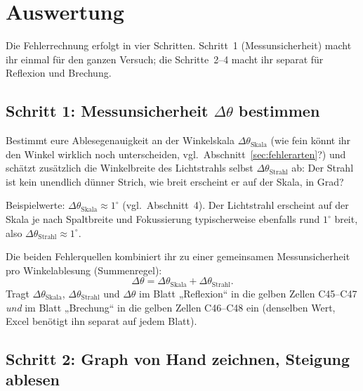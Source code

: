 \documentclass[11pt,a4paper]{article}
\newcommand{\zeichenraum}[1][4.5cm]{%
  \par\vspace{4pt}\noindent
  \fbox{\begin{minipage}[t][#1][t]{\dimexpr\linewidth-2\fboxsep-2\fboxrule}\ \end{minipage}}
  \vspace{4pt}
}
\begin{document}
\section{Auswertung}
\label{sec:auswertung}
Die Fehlerrechnung erfolgt in vier Schritten. Schritt~1 (Messunsicherheit) macht ihr einmal für den ganzen Versuch; die Schritte~2--4 macht ihr separat für Reflexion und Brechung.

\subsection{Schritt 1: Messunsicherheit $\Delta\theta$ bestimmen}
\begin{aufgabebox}
Bestimmt eure Ablesegenauigkeit an der Winkelskala $\Delta\theta_{\text{Skala}}$ (wie fein könnt ihr den Winkel wirklich noch unterscheiden, vgl.\ Abschnitt~\ref{sec:fehlerarten}?) und schätzt zusätzlich die Winkelbreite des Lichtstrahls selbst $\Delta\theta_{\text{Strahl}}$ ab: Der Strahl ist kein unendlich dünner Strich, wie breit erscheint er auf der Skala, in Grad?
\end{aufgabebox}
\zeichenraum[3.2cm]
\begin{solution}
\begin{loesungbox}
Beispielwerte: $\Delta\theta_{\text{Skala}} \approx 1^\circ$ (vgl.\ Abschnitt~4). Der Lichtstrahl erscheint auf der Skala je nach Spaltbreite und Fokussierung typischerweise ebenfalls rund $1^\circ$ breit, also $\Delta\theta_{\text{Strahl}} \approx 1^\circ$.
\end{loesungbox}
\end{solution}

Die beiden Fehlerquellen kombiniert ihr zu einer gemeinsamen Messunsicherheit pro Winkelablesung (Summenregel):
\[
  \Delta\theta = \Delta\theta_{\text{Skala}} + \Delta\theta_{\text{Strahl}}.
\]
Tragt $\Delta\theta_{\text{Skala}}$, $\Delta\theta_{\text{Strahl}}$ und $\Delta\theta$ im Blatt „Reflexion“ in die gelben Zellen C45--C47 \emph{und} im Blatt „Brechung“ in die gelben Zellen C46--C48 ein (denselben Wert, Excel benötigt ihn separat auf jedem Blatt).

\subsection{Schritt 2: Graph von Hand zeichnen, Steigung ablesen}
\end{document}
